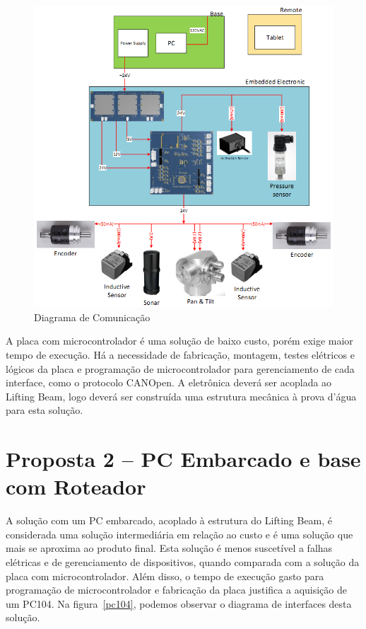 \begin{figure}[H]
    \centering
    \includegraphics[width=1\columnwidth]{figs/eletronica/3.png}
    \caption{Diagrama de Comunicação}
    \label{com_placa}
\end{figure}
 
A placa com microcontrolador é uma solução de baixo custo, porém exige maior tempo de execução. Há a necessidade de fabricação, montagem, testes elétricos e lógicos da placa e programação de microcontrolador para gerenciamento de cada interface, como o protocolo CANOpen. 
A eletrônica deverá ser acoplada ao Lifting Beam, logo deverá ser construída uma estrutura mecânica à prova d’água para esta solução.


\section{Proposta 2 – PC Embarcado e base com Roteador}

A solução com um PC embarcado, acoplado à estrutura do Lifting Beam, é
considerada uma solução intermediária em relação ao custo e é uma solução que
mais se aproxima ao produto final. Esta solução é menos suscetível a falhas
elétricas e de gerenciamento de dispositivos, quando comparada com a solução da
placa com microcontrolador. Além disso, o tempo de execução gasto para programação de microcontrolador e fabricação da placa justifica a aquisição de um PC104. Na figura~\ref{pc104}, podemos observar o diagrama de interfaces desta solução.

